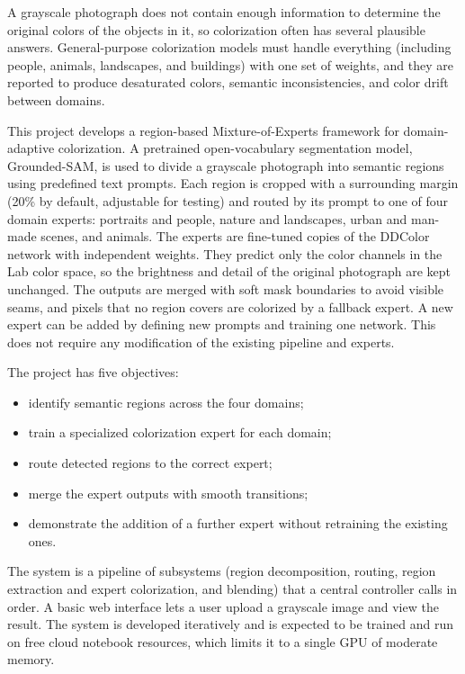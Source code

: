 \documentclass{FastFyp}
\begin{document}
A grayscale photograph does not contain enough information to determine the original colors of the objects in it, so colorization often has several plausible answers. General-purpose colorization models must handle everything (including people, animals, landscapes, and buildings) with one set of weights, and they are reported to produce desaturated colors, semantic inconsistencies, and color drift between domains.

This project develops a region-based Mixture-of-Experts framework for domain-adaptive colorization. A pretrained open-vocabulary segmentation model, Grounded-SAM, is used to divide a grayscale photograph into semantic regions using predefined text prompts. Each region is cropped with a surrounding margin (20\% by default, adjustable for testing) and routed by its prompt to one of four domain experts: portraits and people, nature and landscapes, urban and man-made scenes, and animals. The experts are fine-tuned copies of the DDColor network with independent weights. They predict only the color channels in the Lab color space, so the brightness and detail of the original photograph are kept unchanged. The outputs are merged with soft mask boundaries to avoid visible seams, and pixels that no region covers are colorized by a fallback expert. A new expert can be added by defining new prompts and training one network. This does not require any modification of the existing pipeline and experts.

The project has five objectives:
\begin{itemize}
    \item identify semantic regions across the four domains;
    \item train a specialized colorization expert for each domain;
    \item route detected regions to the correct expert;
    \item merge the expert outputs with smooth transitions;
    \item demonstrate the addition of a further expert without retraining the existing ones.
\end{itemize}

The system is a pipeline of subsystems (region decomposition, routing, region extraction and expert colorization, and blending) that a central controller calls in order. A basic web interface lets a user upload a grayscale image and view the result. The system is developed iteratively and is expected to be trained and run on free cloud notebook resources, which limits it to a single GPU of moderate memory.
\end{document}
